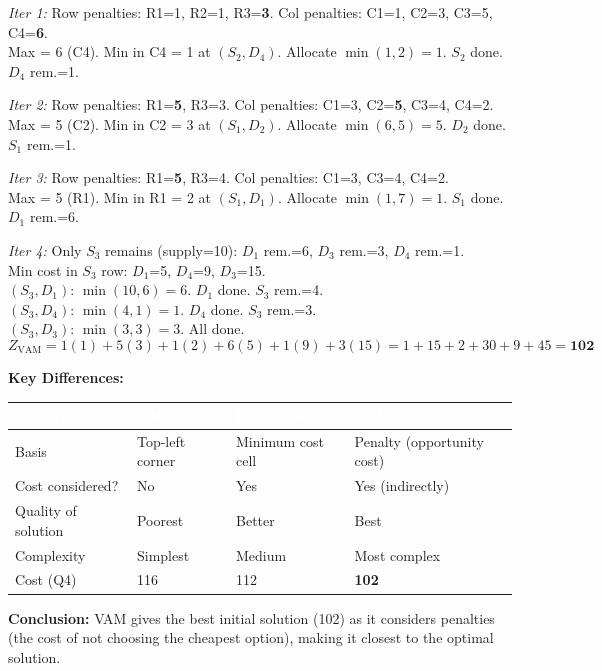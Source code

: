 \documentclass[12pt]{article}
\begin{document}
\begin{ansbox}
\textit{Iter 1:} Row penalties: R1=1, R2=1, R3=\textbf{3}.\; Col penalties: C1=1, C2=3, C3=5, C4=\textbf{6}.\\
Max = 6 (C4). Min in C4 = 1 at $(S_2,D_4)$. Allocate $\min(1,2)=1$. $S_2$ done. $D_4$ rem.=1.

\textit{Iter 2:} Row penalties: R1=\textbf{5}, R3=3.\; Col penalties: C1=3, C2=\textbf{5}, C3=4, C4=2.\\
Max = 5 (C2). Min in C2 = 3 at $(S_1,D_2)$. Allocate $\min(6,5)=5$. $D_2$ done. $S_1$ rem.=1.

\textit{Iter 3:} Row penalties: R1=\textbf{5}, R3=4.\; Col penalties: C1=3, C3=4, C4=2.\\
Max = 5 (R1). Min in R1 = 2 at $(S_1,D_1)$. Allocate $\min(1,7)=1$. $S_1$ done. $D_1$ rem.=6.

\textit{Iter 4:} Only $S_3$ remains (supply=10): $D_1$ rem.=6, $D_3$ rem.=3, $D_4$ rem.=1.\\
Min cost in $S_3$ row: $D_1$=5, $D_4$=9, $D_3$=15.\\
$(S_3,D_1)$: $\min(10,6)=6$. $D_1$ done. $S_3$ rem.=4.\\
$(S_3,D_4)$: $\min(4,1)=1$. $D_4$ done. $S_3$ rem.=3.\\
$(S_3,D_3)$: $\min(3,3)=3$. All done.
\[
  Z_{\text{VAM}} = 1(1)+5(3)+1(2)+6(5)+1(9)+3(15) = 1+15+2+30+9+45 = \mathbf{102}
\]

\medskip
\textbf{Key Differences:}

\begin{center}
\begin{tabular}{|C{3cm}|C{3.5cm}|C{3.5cm}|C{3.5cm}|}
\hline
{}
\textcolor{white}{\textbf{Feature}} & \textcolor{white}{\textbf{NW Corner}} & \textcolor{white}{\textbf{Least Cost}} & \textcolor{white}{\textbf{VAM}}\\
\hline
Basis & Top-left corner & Minimum cost cell & Penalty (opportunity cost)\\
\hline
Cost considered? & No & Yes & Yes (indirectly)\\
\hline
Quality of solution & Poorest & Better & Best\\
\hline
Complexity & Simplest & Medium & Most complex\\
\hline
Cost (Q4) & 116 & 112 & \textbf{102}\\
\hline
\end{tabular}
\end{center}

\textbf{Conclusion:} VAM gives the best initial solution (102) as it considers penalties (the cost of not choosing the cheapest option), making it closest to the optimal solution.
\end{ansbox}
\end{document}
